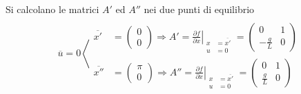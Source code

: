 Si calcolano le matrici $A'$ ed $A''$ nei due punti di equilibrio
$$
\overline{u} = 0 \left\langle
\begin{aligned}
 \\
 \overline{x'} &= \begin{pmatrix}
                  0 \\ 0
                 \end{pmatrix} \Rightarrow
                 A' = \left.\frac{\partial f}{\partial x}
                            \right|_{\begin{aligned}
                                      x &= \overline{x'}\\
                                      u &= 0
                                     \end{aligned}} =
                                     \begin{pmatrix}
                                      0 & 1 \\
                                      -\frac{g}{L} & 0
                                     \end{pmatrix}
\\
 \overline{x''} &= \begin{pmatrix}
                   \pi \\ 0
                  \end{pmatrix} \Rightarrow
                 A'' = \left.\frac{\partial f}{\partial x}
                            \right|_{\begin{aligned}
                                      x &= \overline{x'}\\
                                      u &= 0
                                     \end{aligned}} =
                                     \begin{pmatrix}
                                      0 & 1 \\
                                      \frac{g}{L} & 0
                                     \end{pmatrix}
\end{aligned} \right.
$$


